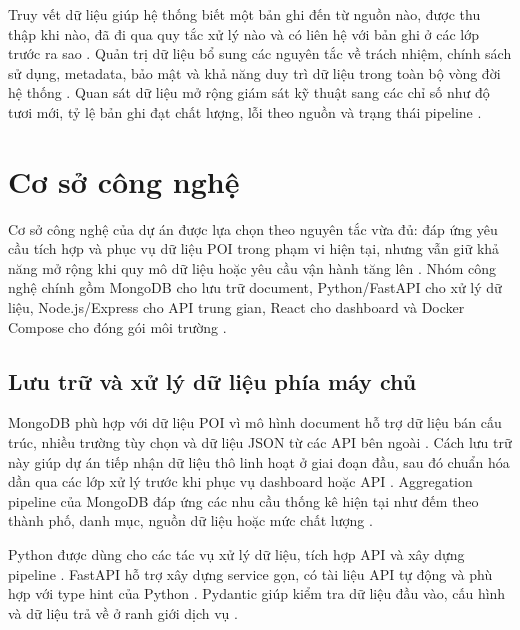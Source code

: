 \documentclass[12pt,a4paper]{article}
\begin{document}
Truy vết dữ liệu giúp hệ thống biết một bản ghi đến từ nguồn nào, được thu thập khi nào, đã đi qua quy tắc xử lý nào và có liên hệ với bản ghi ở các lớp trước ra sao \cite{ibmLineage}. Quản trị dữ liệu bổ sung các nguyên tắc về trách nhiệm, chính sách sử dụng, metadata, bảo mật và khả năng duy trì dữ liệu trong toàn bộ vòng đời hệ thống \cite{damaDmbok}. Quan sát dữ liệu mở rộng giám sát kỹ thuật sang các chỉ số như độ tươi mới, tỷ lệ bản ghi đạt chất lượng, lỗi theo nguồn và trạng thái pipeline \cite{opentelemetrySignals}.\par


\section{Cơ sở công nghệ}

Cơ sở công nghệ của dự án được lựa chọn theo nguyên tắc vừa đủ: đáp ứng yêu cầu tích hợp và phục vụ dữ liệu POI trong phạm vi hiện tại, nhưng vẫn giữ khả năng mở rộng khi quy mô dữ liệu hoặc yêu cầu vận hành tăng lên \cite{ibmWarehouseLake}. Nhóm công nghệ chính gồm MongoDB cho lưu trữ document, Python/FastAPI cho xử lý dữ liệu, Node.js/Express cho API trung gian, React cho dashboard và Docker Compose cho đóng gói môi trường \cite{dockerCompose}.\par

\subsection{Lưu trữ và xử lý dữ liệu phía máy chủ}

MongoDB phù hợp với dữ liệu POI vì mô hình document hỗ trợ dữ liệu bán cấu trúc, nhiều trường tùy chọn và dữ liệu JSON từ các API bên ngoài \cite{mongodbDataModel}. Cách lưu trữ này giúp dự án tiếp nhận dữ liệu thô linh hoạt ở giai đoạn đầu, sau đó chuẩn hóa dần qua các lớp xử lý trước khi phục vụ dashboard hoặc API \cite{mongodbDataModel}. Aggregation pipeline của MongoDB đáp ứng các nhu cầu thống kê hiện tại như đếm theo thành phố, danh mục, nguồn dữ liệu hoặc mức chất lượng \cite{mongodbAggregation}.\par

Python được dùng cho các tác vụ xử lý dữ liệu, tích hợp API và xây dựng pipeline \cite{pythonApps}. FastAPI hỗ trợ xây dựng service gọn, có tài liệu API tự động và phù hợp với type hint của Python \cite{fastapiFeatures}. Pydantic giúp kiểm tra dữ liệu đầu vào, cấu hình và dữ liệu trả về ở ranh giới dịch vụ \cite{pydanticModels}.\par
\end{document}
